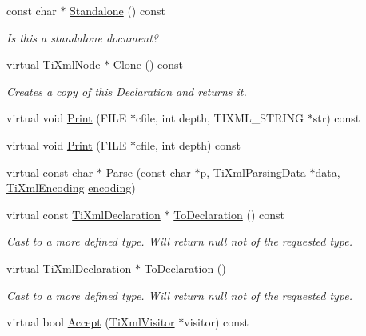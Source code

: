 \begin{DoxyCompactItemize}
const char $\ast$ \hyperlink{class_ti_xml_declaration_a9ff06afc033d7ef730ec7c6825b97ad9}{Standalone} () const 
\begin{DoxyCompactList}\small\item\em Is this a standalone document? \item\end{DoxyCompactList}\item 
virtual \hyperlink{class_ti_xml_node}{TiXmlNode} $\ast$ \hyperlink{class_ti_xml_declaration_aff8231266d735943d8a7514a9c9822b9}{Clone} () const 
\begin{DoxyCompactList}\small\item\em Creates a copy of this Declaration and returns it. \item\end{DoxyCompactList}\item 
virtual void \hyperlink{class_ti_xml_declaration_aa5ab32ec19d4eeecff4a9238c6c90565}{Print} (FILE $\ast$cfile, int depth, TIXML\_\-STRING $\ast$str) const 
\item 
virtual void \hyperlink{class_ti_xml_declaration_abf6303db4bd05b5be554036817ff1cb4}{Print} (FILE $\ast$cfile, int depth) const 
\item 
virtual const char $\ast$ \hyperlink{class_ti_xml_declaration_a9839ea97ed687a2b7342fd7b0f04361b}{Parse} (const char $\ast$p, \hyperlink{class_ti_xml_parsing_data}{TiXmlParsingData} $\ast$data, \hyperlink{tinyxml_8h_a88d51847a13ee0f4b4d320d03d2c4d96}{TiXmlEncoding} \hyperlink{class_ti_xml_declaration_a24b8645d7696ec169bbb3fb7d30860cf}{encoding})
\item 
virtual const \hyperlink{class_ti_xml_declaration}{TiXmlDeclaration} $\ast$ \hyperlink{class_ti_xml_declaration_a1e085d3fefd1dbf5ccdbff729931a967}{ToDeclaration} () const 
\begin{DoxyCompactList}\small\item\em Cast to a more defined type. Will return null not of the requested type. \item\end{DoxyCompactList}\item 
virtual \hyperlink{class_ti_xml_declaration}{TiXmlDeclaration} $\ast$ \hyperlink{class_ti_xml_declaration_a6bd3d1daddcaeb9543c24bfd090969ce}{ToDeclaration} ()
\begin{DoxyCompactList}\small\item\em Cast to a more defined type. Will return null not of the requested type. \item\end{DoxyCompactList}\item 
virtual bool \hyperlink{class_ti_xml_declaration_ab6a6b178161ba9abc2c35058de689864}{Accept} (\hyperlink{class_ti_xml_visitor}{TiXmlVisitor} $\ast$visitor) const 
\end{DoxyCompactItemize}
